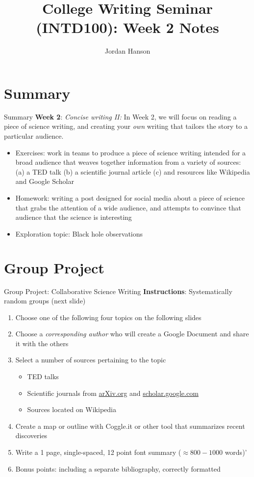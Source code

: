 \documentclass{beamer}
\title{College Writing Seminar (INTD100): Week 2 Notes}
\author{Jordan Hanson}
\institute{Whittier College Department of Physics and Astronomy}
\begin{document}
\maketitle

\section{Summary}

\begin{frame}{Summary}
\textbf{Week 2}: \textit{Concise writing II:} In Week 2, we will focus on reading a piece of science writing, and creating your \textit{own} writing that tailors the story to a particular audience.
\begin{itemize}
\item Exercises: work in teams to produce a piece of science writing intended for a broad audience that weaves together information from a variety of sources: (a) a TED talk (b) a scientific journal article (c) and resources like Wikipedia and Google Scholar
\item Homework: writing a post designed for social media about a piece of science that grabs the attention of a wide audience, and attempts to convince that audience that the science is interesting
\item Exploration topic: Black hole observations
\end{itemize}
\end{frame}

\section{Group Project}

\begin{frame}{Group Project: Collaborative Science Writing}
\textbf{\alert{Instructions}}: Systematically random groups (next slide)
\begin{enumerate}
\item Choose one of the following four topics on the following slides
\item Choose a \textit{corresponding author} who will create a Google Document and share it with the others
\item Select a number of sources pertaining to the topic
\begin{itemize}
\item TED talks
\item Scientific journals from \url{arXiv.org} and \url{scholar.google.com}
\item Sources located on Wikipedia
\end{itemize}
\item Create a map or outline with Coggle.it or other tool that summarizes recent discoveries
\item Write a 1 page, single-spaced, 12 point font summary ($\approx 800-1000$ words)'
\item \alert{Bonus points: including a separate bibliography, correctly formatted}
\end{enumerate}
\end{frame}
\end{document}
